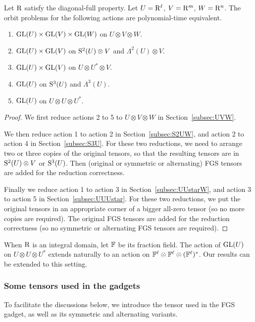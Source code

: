 \begin{theorem}
		Let $\rng$ satisfy the diagonal-full property. Let $U=\rng^\ell$, $V=\rng^m$, $W=\rng^n$. The orbit problems for the following actions are polynomial-time equivalent. 
	\begin{enumerate}
		\item $\GL(U)\times\GL(V)\times\GL(W)$ on $U\otimes V\otimes W$. 
		\item $\GL(U)\times \GL(V)$ on $\S^2(U)\otimes V$ and $\Lambda^2(U)\otimes V$. 
		\item $\GL(U)\times \GL(V)$ on $U\otimes U^*\otimes V$. 
		\item $\GL(U)$ on $\S^3(U)$ and $\Lambda^3(U)$. 
		\item $\GL(U)$ on $U\otimes U\otimes U^*$.
	\end{enumerate}
\end{theorem}
\begin{proof}
	We first reduce actions 2 to 5 to $U\otimes V\otimes W$ in Section~\ref{subsec:UVW}. 
	
	We then reduce action 1 to action 2 in Section~\ref{subsec:S2UW}, and action 2 to action 4 in Section~\ref{subsec:S3U}. For these two reductions, we need to arrange two or three copies of the original tensors, so that the resulting tensors are in $\S^2(U)\otimes V$ or $\S^3(U)$. Then (original or symmetric or alternating) FGS tensors are added for the reduction correctness. 
	
	Finally we reduce action 1 to action 3 in Section~\ref{subsec:UUstarW}, and action 3 to action 5 in Section~\ref{subsec:UUUstar}. For these two reductions, we put the original tensors in an appropriate corner of a bigger all-zero tensor (so no more copies are required). The original FGS tensors are added for the reduction correctness (so no symmetric or alternating FGS tensors are required).
\end{proof}

When $\rng$ is an integral domain, let $\F$ be its fraction field. The action of $\GL(U)$ on $U\otimes U\otimes U^*$ extends naturally to an action on $\F^\ell\otimes \F^\ell\otimes (\F^\ell)^*$. Our results can be extended to this setting.


\subsubsection{Some tensors used in the gadgets}

To facilitate the discussions below, we introduce the tensor used in the FGS gadget, as well as its symmetric and alternating variants. 

